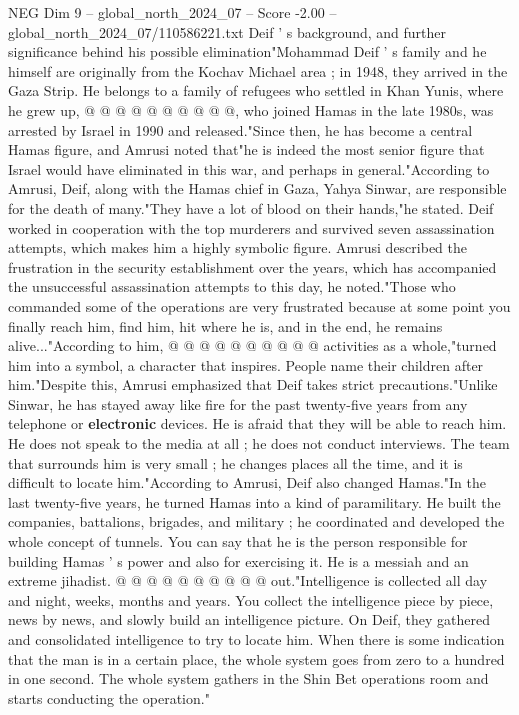 \begin{textsample}{NEG Dim 9 – global\_north\_2024\_07 – Score -2.00 – global\_north\_2024\_07/110586221.txt}
Deif ' s background, and further significance behind his possible elimination"Mohammad Deif ' s family and he himself are originally from the Kochav Michael area ; in 1948, they arrived in the Gaza Strip.
He belongs to a family of refugees who settled in Khan Yunis, where he grew up, @ @ @ @ @ @ @ @ @ @, who joined Hamas in the late 1980s, was arrested by Israel in 1990 and released."Since then, he has become a central Hamas figure, and Amrusi noted that"he is indeed the most senior figure that Israel would have eliminated in this war, and perhaps in general."According to Amrusi, Deif, along with the Hamas chief in Gaza, Yahya Sinwar, are responsible for the death of many."They have a lot of blood on their hands,"he stated.
Deif worked in cooperation with the top murderers and survived seven assassination attempts, which makes him a highly symbolic figure.
Amrusi described the frustration in the security establishment over the years, which has accompanied the unsuccessful assassination attempts to this day, he noted."Those who commanded some of the operations are very frustrated because at some point you finally reach him, find him, hit where he is, and in the end, he remains alive..."According to him, @ @ @ @ @ @ @ @ @ @ activities as a whole,"turned him into a symbol, a character that inspires.
People name their children after him."Despite this, Amrusi emphasized that Deif takes strict precautions."Unlike Sinwar, he has stayed away like fire for the past twenty-five years from any telephone or \textbf{electronic} devices.
He is afraid that they will be able to reach him.
He does not speak to the media at all ; he does not conduct interviews.
The team that surrounds him is very small ; he changes places all the time, and it is difficult to locate him."According to Amrusi, Deif also changed Hamas."In the last twenty-five years, he turned Hamas into a kind of paramilitary.
He built the companies, battalions, brigades, and military ; he coordinated and developed the whole concept of tunnels.
You can say that he is the person responsible for building Hamas ' s power and also for exercising it.
He is a messiah and an extreme jihadist. @ @ @ @ @ @ @ @ @ @ out."Intelligence is collected all day and night, weeks, months and years.
You collect the intelligence piece by piece, news by news, and slowly build an intelligence picture.
On Deif, they gathered and consolidated intelligence to try to locate him.
When there is some indication that the man is in a certain place, the whole system goes from zero to a hundred in one second.
The whole system gathers in the Shin Bet operations room and starts conducting the operation."

\end{textsample}
